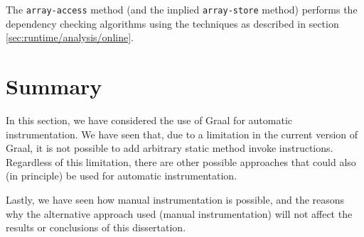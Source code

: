 The \texttt{array-access} method (and the implied \texttt{array-store} method) performs the dependency checking algorithms using the techniques as described in section \ref{sec:runtime/analysis/online}.
	
\section{Summary} \label{sec:instrumentation/summary}
In this section, we have considered the use of Graal for automatic instrumentation. We have seen that, due to a limitation in the current version of Graal, it is not possible to add arbitrary static method invoke instructions. Regardless of this limitation, there are other possible approaches that could also (in principle) be used for automatic instrumentation.

Lastly, we have seen how manual instrumentation is possible, and the reasons why the alternative approach used (manual instrumentation) will not affect the results or conclusions of this dissertation.